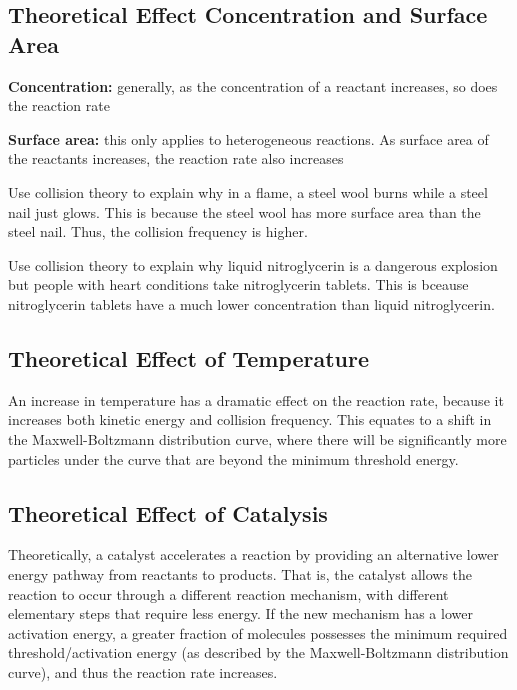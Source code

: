 \subsection{Theoretical Effect Concentration and Surface Area}
\begin{bulleted-list}
    \item \textbf{Concentration:} generally, as the concentration of a reactant increases, so does
        the reaction rate
    \item \textbf{Surface area:} this only applies to heterogeneous reactions. As surface area
        of the reactants increases, the reaction rate also increases
\end{bulleted-list}

\begin{sample}{Use collision theory to explain why in a flame, a steel wool burns while a steel
    nail just glows.}
    This is because the steel wool has more surface area than the steel nail. Thus, the collision
    frequency is higher.
\end{sample}

\begin{sample}{Use collision theory to explain why liquid nitroglycerin is a dangerous explosion
    but people with heart conditions take nitroglycerin tablets.}
    This is bceause nitroglycerin tablets have a much lower concentration than liquid nitroglycerin.
\end{sample}

\subsection{Theoretical Effect of Temperature}
An increase in temperature has a dramatic effect on the reaction rate, because it increases both
kinetic energy and collision frequency. This equates to a shift in the Maxwell-Boltzmann distribution
curve, where there will be significantly more particles under the curve that are beyond the minimum
threshold energy. 

\subsection{Theoretical Effect of Catalysis}
Theoretically, a catalyst accelerates a reaction by providing an alternative lower energy pathway
from reactants to products. That is, the catalyst allows the reaction to occur through a different
reaction mechanism, with different elementary steps that require less energy. If the new mechanism
has a lower activation energy, a greater fraction of molecules possesses the minimum required
threshold/activation energy (as described by  the Maxwell-Boltzmann distribution curve), and thus 
the reaction rate increases.
